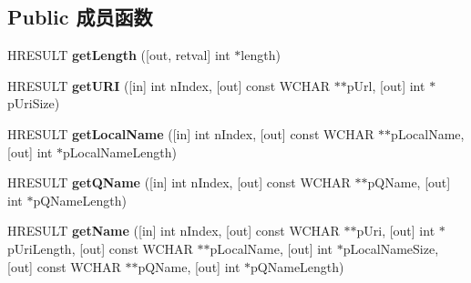 \subsection*{Public 成员函数}
\begin{DoxyCompactItemize}
\item 
\mbox{\label{interface_m_s_x_m_l2_1_1_i_s_a_x_attributes_a23a22ca002bee75bbf5ae5259a2846cf}} 
H\+R\+E\+S\+U\+LT {\bfseries get\+Length} (\mbox{[}out, retval\mbox{]} int $\ast$length)
\item 
\mbox{\label{interface_m_s_x_m_l2_1_1_i_s_a_x_attributes_acbdb28816a06463f13ff56e8260fe905}} 
H\+R\+E\+S\+U\+LT {\bfseries get\+U\+RI} (\mbox{[}in\mbox{]} int n\+Index, \mbox{[}out\mbox{]} const W\+C\+H\+AR $\ast$$\ast$p\+Url, \mbox{[}out\mbox{]} int $\ast$p\+Uri\+Size)
\item 
\mbox{\label{interface_m_s_x_m_l2_1_1_i_s_a_x_attributes_a9959ded7602de758dfe11de8043b5997}} 
H\+R\+E\+S\+U\+LT {\bfseries get\+Local\+Name} (\mbox{[}in\mbox{]} int n\+Index, \mbox{[}out\mbox{]} const W\+C\+H\+AR $\ast$$\ast$p\+Local\+Name, \mbox{[}out\mbox{]} int $\ast$p\+Local\+Name\+Length)
\item 
\mbox{\label{interface_m_s_x_m_l2_1_1_i_s_a_x_attributes_aa42f53998fdf72109c1629bd6cb35f6a}} 
H\+R\+E\+S\+U\+LT {\bfseries get\+Q\+Name} (\mbox{[}in\mbox{]} int n\+Index, \mbox{[}out\mbox{]} const W\+C\+H\+AR $\ast$$\ast$p\+Q\+Name, \mbox{[}out\mbox{]} int $\ast$p\+Q\+Name\+Length)
\item 
\mbox{\label{interface_m_s_x_m_l2_1_1_i_s_a_x_attributes_a49255d4e809674df76eb9d9bbfeaabc2}} 
H\+R\+E\+S\+U\+LT {\bfseries get\+Name} (\mbox{[}in\mbox{]} int n\+Index, \mbox{[}out\mbox{]} const W\+C\+H\+AR $\ast$$\ast$p\+Uri, \mbox{[}out\mbox{]} int $\ast$p\+Uri\+Length, \mbox{[}out\mbox{]} const W\+C\+H\+AR $\ast$$\ast$p\+Local\+Name, \mbox{[}out\mbox{]} int $\ast$p\+Local\+Name\+Size, \mbox{[}out\mbox{]} const W\+C\+H\+AR $\ast$$\ast$p\+Q\+Name, \mbox{[}out\mbox{]} int $\ast$p\+Q\+Name\+Length)
\item 
\mbox{\label{interface_m_s_x_m_l2_1_1_i_s_a_x_attributes_a4b7c666c8db7aced72a2fb61342d5ea8}} 

\end{DoxyCompactItemize}
